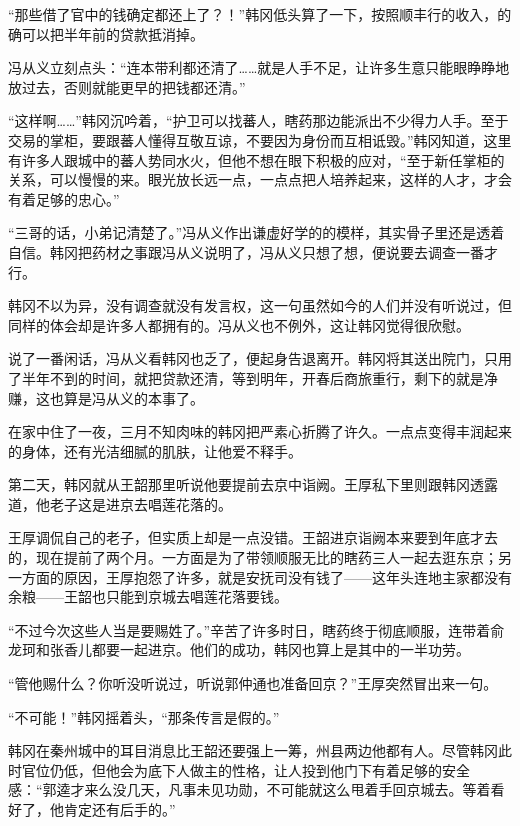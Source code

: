 “那些借了官中的钱确定都还上了？！”韩冈低头算了一下，按照顺丰行的收入，的确可以把半年前的贷款抵消掉。

冯从义立刻点头：“连本带利都还清了……就是人手不足，让许多生意只能眼睁睁地放过去，否则就能更早的把钱都还清。”

“这样啊……”韩冈沉吟着，“护卫可以找蕃人，瞎药那边能派出不少得力人手。至于交易的掌柜，要跟蕃人懂得互敬互谅，不要因为身份而互相诋毁。”韩冈知道，这里有许多人跟城中的蕃人势同水火，但他不想在眼下积极的应对，“至于新任掌柜的关系，可以慢慢的来。眼光放长远一点，一点点把人培养起来，这样的人才，才会有着足够的忠心。”

“三哥的话，小弟记清楚了。”冯从义作出谦虚好学的的模样，其实骨子里还是透着自信。韩冈把药材之事跟冯从义说明了，冯从义只想了想，便说要去调查一番才行。

韩冈不以为异，没有调查就没有发言权，这一句虽然如今的人们并没有听说过，但同样的体会却是许多人都拥有的。冯从义也不例外，这让韩冈觉得很欣慰。

说了一番闲话，冯从义看韩冈也乏了，便起身告退离开。韩冈将其送出院门，只用了半年不到的时间，就把贷款还清，等到明年，开春后商旅重行，剩下的就是净赚，这也算是冯从义的本事了。

在家中住了一夜，三月不知肉味的韩冈把严素心折腾了许久。一点点变得丰润起来的身体，还有光洁细腻的肌肤，让他爱不释手。

第二天，韩冈就从王韶那里听说他要提前去京中诣阙。王厚私下里则跟韩冈透露道，他老子这是进京去唱莲花落的。

王厚调侃自己的老子，但实质上却是一点没错。王韶进京诣阙本来要到年底才去的，现在提前了两个月。一方面是为了带领顺服无比的瞎药三人一起去逛东京；另一方面的原因，王厚抱怨了许多，就是安抚司没有钱了——这年头连地主家都没有余粮——王韶也只能到京城去唱莲花落要钱。

“不过今次这些人当是要赐姓了。”辛苦了许多时日，瞎药终于彻底顺服，连带着俞龙珂和张香儿都要一起进京。他们的成功，韩冈也算上是其中的一半功劳。

“管他赐什么？你听没听说过，听说郭仲通也准备回京？”王厚突然冒出来一句。

“不可能！”韩冈摇着头，“那条传言是假的。”

韩冈在秦州城中的耳目消息比王韶还要强上一筹，州县两边他都有人。尽管韩冈此时官位仍低，但他会为底下人做主的性格，让人投到他门下有着足够的安全感：“郭逵才来么没几天，凡事未见功勋，不可能就这么甩着手回京城去。等着看好了，他肯定还有后手的。”

